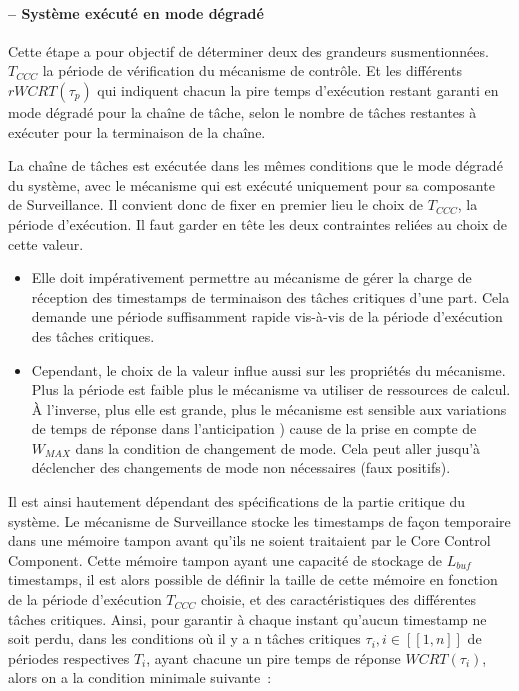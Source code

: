 \documentclass[french, a4paper, 11pt, twoside, pdftex]{StyleThese}
\begin{document}
    	\paragraph{ -- Système exécuté en mode dégradé}
    	
    		Cette étape a pour objectif de déterminer deux des grandeurs susmentionnées. $T_{CCC}$ la période de vérification du mécanisme de contrôle. Et les différents $rWCRT(\tau_p)$ qui indiquent chacun la pire temps d'exécution restant garanti en mode dégradé pour la chaîne de tâche, selon le nombre de tâches restantes à exécuter pour la terminaison de la chaîne.
    		
    		La chaîne de tâches est exécutée dans les mêmes conditions que le mode dégradé du système, avec le mécanisme qui est exécuté uniquement pour sa composante de Surveillance. Il convient donc de fixer en premier lieu le choix de $T_{CCC}$, la période d'exécution. Il faut garder en tête les deux contraintes reliées au choix de cette valeur. 
    		\begin{itemize}
    			\item Elle doit impérativement permettre au mécanisme de gérer la charge de réception des timestamps de terminaison des tâches critiques d'une part. Cela demande une période suffisamment rapide vis-à-vis de la période d'exécution des tâches critiques. 
    			\item Cependant, le choix de la valeur influe aussi sur les propriétés du mécanisme. Plus la période est faible plus le mécanisme va utiliser de ressources de calcul. À l'inverse, plus elle est grande, plus le mécanisme est sensible aux variations de temps de réponse dans l'anticipation ) cause de la prise en compte de $W_{MAX}$ dans la condition de changement de mode. Cela peut aller jusqu'à déclencher des changements de mode non nécessaires (faux positifs). 
    		\end{itemize}
    		Il est ainsi hautement dépendant des spécifications de la partie critique du système.
    		Le mécanisme de Surveillance stocke les timestamps de façon temporaire dans une mémoire tampon avant qu'ils ne soient traitaient par le Core Control Component. Cette mémoire tampon ayant une capacité de stockage de $L_{buf}$ timestamps, il est alors possible de définir la taille de cette mémoire en fonction de la période d'exécution $T_{CCC}$ choisie, et des caractéristiques des différentes tâches critiques. 
    		Ainsi, pour garantir à chaque instant qu'aucun timestamp ne soit perdu, dans les conditions où il y a n tâches critiques $\tau_i, i \in [\![1,n]\!]$ de périodes respectives $T_i$, ayant chacune un pire temps de réponse $WCRT(\tau_i)$, alors on a la condition minimale suivante~:
\end{document}
